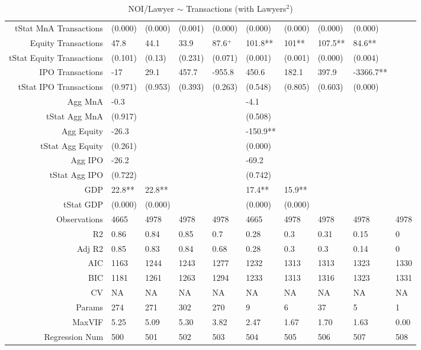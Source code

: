 \begin{table}[ht]
\begin{tabular}{rlllllllll}
  tStat MnA Transactions & (0.000) & (0.000) & (0.001) & (0.000) & (0.000) & (0.000) & (0.000) & (0.000) &  \\ 
  Equity Transactions & 47.8 & 44.1 & 33.9 & 87.6$^{+}$ & 101.8** & 101** & 107.5** & 84.6** &  \\ 
  tStat Equity Transactions & (0.101) & (0.13) & (0.231) & (0.071) & (0.001) & (0.001) & (0.000) & (0.004) &  \\ 
  IPO Transactions & -17 & 29.1 & 457.7 & -955.8 & 450.6 & 182.1 & 397.9 & -3366.7** &  \\ 
  tStat IPO Transactions & (0.971) & (0.953) & (0.393) & (0.263) & (0.548) & (0.805) & (0.603) & (0.000) &  \\ 
  Agg MnA & -0.3 &  &  &  & -4.1 &  &  &  &  \\ 
  tStat Agg MnA & (0.917) &  &  &  & (0.508) &  &  &  &  \\ 
  Agg Equity & -26.3 &  &  &  & -150.9** &  &  &  &  \\ 
  tStat Agg Equity & (0.261) &  &  &  & (0.000) &  &  &  &  \\ 
  Agg IPO & -26.2 &  &  &  & -69.2 &  &  &  &  \\ 
  tStat Agg IPO & (0.722) &  &  &  & (0.742) &  &  &  &  \\ 
  GDP & 22.8** & 22.8** &  &  & 17.4** & 15.9** &  &  &  \\ 
  tStat GDP & (0.000) & (0.000) &  &  & (0.000) & (0.000) &  &  &  \\ 
  Observations & 4665 & 4978 & 4978 & 4978 & 4665 & 4978 & 4978 & 4978 & 4978 \\ 
  R2 & 0.86 & 0.84 & 0.85 & 0.7 & 0.28 & 0.3 & 0.31 & 0.15 & 0 \\ 
  Adj R2 & 0.85 & 0.83 & 0.84 & 0.68 & 0.28 & 0.3 & 0.3 & 0.14 & 0 \\ 
  AIC & 1163 & 1244 & 1243 & 1277 & 1232 & 1313 & 1313 & 1323 & 1330 \\ 
  BIC & 1181 & 1261 & 1263 & 1294 & 1233 & 1313 & 1316 & 1323 & 1331 \\ 
  CV & NA & NA & NA & NA & NA & NA & NA & NA & NA \\ 
  Params & 274 & 271 & 302 & 270 & 9 & 6 & 37 & 5 & 1 \\ 
  MaxVIF & 5.25 & 5.09 & 5.30 & 3.82 & 2.47 & 1.67 & 1.70 & 1.63 & 0.00 \\ 
  Regression Num & 500 & 501 & 502 & 503 & 504 & 505 & 506 & 507 & 508 \\ 
   \hline
\end{tabular}
\caption{NOI/Lawyer $\sim$ Transactions (with Lawyers$^2$)} 
\end{table}
